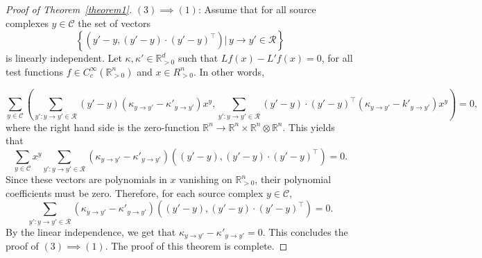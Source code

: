 \documentclass[10pt,a4paper]{amsart}
\def\R{\mathbb{R}}
\def\cC{\mathcal{C}}
\def\cR{\mathcal{R}}
\def\k{\kappa}
\begin{document}
\begin{proof}[Proof of Theorem~\ref{theorem1}]
$(3) \implies (1)$: 
 Assume that for all source complexes $y \in \cC$ the set of vectors 
$$\left\{\left(y' - y,(y' - y)\cdot (y' - y)^{\intercal}\right) \big| \, y\to y'\in\cR \right\}$$
is linearly independent. Let $\k,\k'\in\R^d_{>0}$ such that $L f(x) - L' f(x) = 0$, for all test functions $f\in C^{\infty}_c(\R_{> 0}^n)$ and $x \in R_{> 0}^n$. In other words,

$$\sum_{y \in \cC} \left(\sum_{y' \colon y\to y'\in \cR}(y' - y)(\k_{y\to y'} - \k'_{y\to y'})x^y,\sum_{y' \colon y\to y'\in \cR}(y' - y)\cdot(y' - y)^{\intercal}(\k_{y\to y'}-k'_{y\to y'})x^y \right)= 0,$$
where the right hand side is the zero-function $\R^n\to \R^{n}\times\R^n \otimes \R^n$. This yields that
$$\sum_{y\in \cC}x^y\sum_{y' \colon  y\to y'\in \cR} (\k_{y\to y'}-\k'_{y\to y'}) \left((y' - y),(y' - y)\cdot(y' - y)^{\intercal}\right)= 0.$$
Since these vectors are polynomials in $x$ vanishing on $\R^n_{>0}$, their polynomial coefficients must be zero. Therefore, for each source complex $y\in\cC$,
$$
\sum_{y' \colon y\to y'\in \cR}(\k_{y\to y'}-\k'_{y\to y'}) \left((y' - y),(y' - y)\cdot(y' - y)^{\intercal}\right)= 0 .
$$
By the linear independence, we get that $\k_{y\to y'}-\k'_{y\to y'}=0$. This concludes the proof of $(3) \implies (1)$. The proof of this theorem is complete.
\end{proof}
\end{document}
